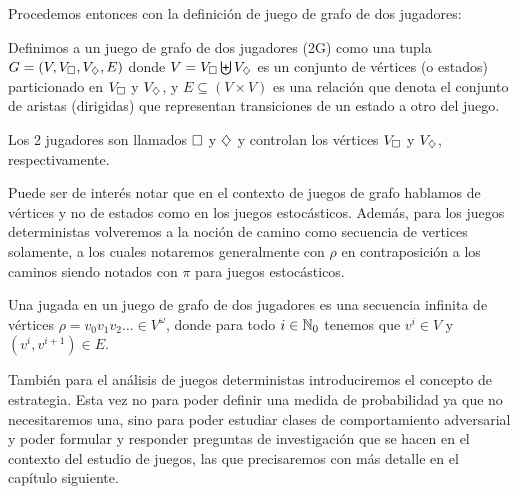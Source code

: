 Procedemos entonces con la definición de juego de grafo de dos jugadores:

\begin{definition}
	Definimos a un juego de grafo de dos jugadores (2G) como una tupla $G = (V, V_\square,V_\diamondsuit, E)$ donde $V = V_\square \biguplus V_\diamondsuit$ es un conjunto de vértices (o estados) particionado en $V_\square$ y $V_\diamondsuit$, y $E \subseteq (V\times V)$ es una relación que denota el conjunto de aristas (dirigidas) que representan transiciones de un estado a otro del juego.

	Los 2 jugadores son llamados $\square$ y $\diamondsuit$ y controlan los vértices
	$V_\square$ y $V_\diamondsuit$, respectivamente.
\end{definition}

Puede ser de interés notar que en el contexto de juegos de grafo hablamos de
vértices y no de estados como en los juegos estocásticos. Además, para los
juegos deterministas volveremos a la noción de camino como secuencia de
vertices solamente, a los cuales notaremos generalmente con $\rho$ en
contraposición a los caminos siendo notados con $\pi$ para juegos estocásticos.

\begin{definition}
	Una jugada en un juego de grafo de dos jugadores es una secuencia infinita de vértices $\rho = v_0v_1v_2 \dots \in V^\omega$, donde para todo $i \in \mathbb{N}_0$ tenemos que $v^i \in V$ y $(v^i, v^{i+1}) \in E$.

\end{definition}

También para el análisis de juegos deterministas introduciremos el concepto de
estrategia. Esta vez no para poder definir una medida de probabilidad ya que no
necesitaremos una, sino para poder estudiar clases de comportamiento
adversarial y poder formular y responder preguntas de investigación que se
hacen en el contexto del estudio de juegos, las que precisaremos con más
detalle en el capítulo siguiente.


